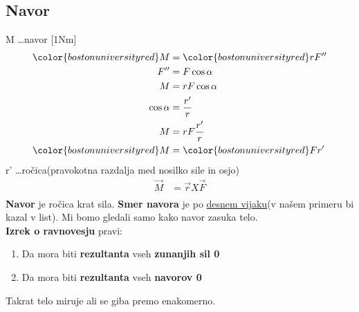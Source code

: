{\color{indiagreen}\subsection{Navor}}
M \dots navor [1Nm]\\
\begin{align*}
	{\color{bostonuniversityred}M} &= {\color{bostonuniversityred}rF''}\\
	F'' &= F\cos\alpha\\
	M &= rF\cos\alpha\\
	\cos\alpha &= \frac{r'}{r}\\
	M &= rF\frac{r'}{r}\\
	{\color{bostonuniversityred}M} &= {\color{bostonuniversityred}Fr'}\\
\end{align*}
r' \dots ročica(pravokotna razdalja med nosilko sile in osjo)\\
\begin{align*}
	\vec{M} &= \vec{r} X \vec{F}\\
\end{align*}
\textbf{Navor} je ročica krat sila. \textbf{Smer navora} je po \underline{desnem vijaku}(v našem primeru bi kazal v list). Mi bomo gledali samo kako navor zasuka telo.\\
\textbf{Izrek o ravnovesju} pravi:
\begin{enumerate}
	\item Da mora biti \textbf{rezultanta} vseh \textbf{zunanjih sil 0}
	\item Da mora biti \textbf{rezultanta} vseh \textbf{navorov 0}
\end{enumerate}
Takrat telo miruje ali se giba premo enakomerno.